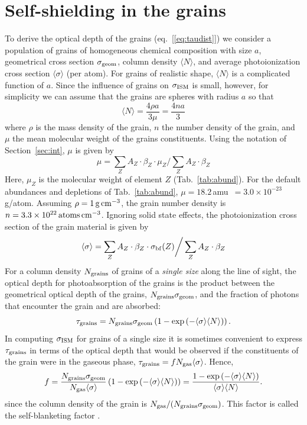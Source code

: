 \documentclass{aastex}
\newcommand{\sbf}{\ensuremath{\sigma_{\rm bf}}}
\newcommand{\avg}[1]{\ensuremath{\langle #1 \rangle}}
\newcommand{\sigism}{\ensuremath{\sigma_{\rm ISM}}}
\newcommand{\Nbar}{\ensuremath{\avg{N}}}
\newcommand{\sigbar}{\ensuremath{\avg{\sigma}}}
\begin{document}
\section{Self-shielding in the grains}\label{sec:f}
To derive the optical depth of the grains (eq.~[\ref{eq:taudist}]) we
consider a population of grains of homogeneous chemical composition with
size $a$, geometrical cross section $\sigma_{\rm geom}$, column density
$\Nbar$, and average photoionization cross section $\sigbar$ (per atom).
For grains of realistic shape, $\Nbar$ is a complicated function of $a$.
Since the influence of grains on $\sigism$ is small, however, for
simplicity we can assume that the grains are spheres with radius $a$ so
that
\begin{equation}
\Nbar = \frac{4 \rho a}{3 \mu}=\frac{4na}{3}
\end{equation}
where $\rho$ is the mass density of the grain, $n$ the number
density of the grain, and $\mu$ the mean molecular weight of the
grains constituents. Using the notation of Section~\ref{sec:int},
$\mu$ is given by
\begin{equation}
 \mu  = \sum_Z A_Z \cdot \beta_Z \cdot \mu_Z \bigg/ \sum_Z
 A_Z\cdot \beta_Z
\end{equation}
Here, $\mu_Z$ is the molecular weight of element $Z$
(Tab.~\ref{tab:abund}). For the default abundances and depletions
of Tab.~\ref{tab:abund}, $\mu=18.2$\,amu\ $=3.0\times
10^{-23}$\,g/atom.  Assuming $\rho=1\,\rm g\,cm^{-3}$, the grain
number density is $n=3.3\times 10^{22}\,\rm atoms\,cm^{-3}$.  Ignoring
solid state effects, the photoionization cross section of the
grain material is given by
\begin{equation}
 \sigbar = \sum_Z A_Z \cdot \beta_Z \cdot \sbf(Z) \bigg/ \sum_Z
 A_Z\cdot \beta_Z
\end{equation}
For a column density $N_{\rm grains}$ of grains of a \emph{single size}
along the line of sight, the optical depth for photoabsorption of
the grains is the product between the geometrical optical depth
of the grains, $N_{\rm grains}\sigma_{\rm geom}$, and the fraction
of photons that encounter the grain and are absorbed:
\begin{equation}\label{eq:taugrain}
\tau_{\rm grains} = N_{\rm grains} \sigma_{\rm geom} 
                   \left( 1-\exp\left(-\sigbar \Nbar\right)\right).
\end{equation}
In computing $\sigism$ for grains of a single size it is
sometimes convenient to express $\tau_{\rm grains}$ in terms of
the optical depth that would be observed if the constituents of
the grain were in the gaseous phase, $\tau_{\rm grains} = f
N_{\rm gas} \sigbar$.  Hence,
\begin{equation}\label{eq:fonesize}
f=\frac{N_{\rm grains} \sigma_{\rm geom}}{N_{\rm gas} \sigbar}
                   \left( 1-\exp\left(-\sigbar \Nbar\right)\right)
= \frac{1-\exp\left(-\sigbar \Nbar\right)}{\sigbar\Nbar}.
\end{equation}
since the column density of the grain is $N_{\rm gas}/(N_{\rm
  grains}\sigma_{\rm geom})$.  This factor is called the
self-blanketing factor \citep{fireman:74a}. 
\end{document}
